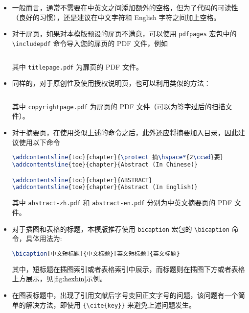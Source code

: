\begin{itemize}
    \item 一般而言，通常不需要在中英文之间添加额外的空格，但为了代码的可读性（良好的习惯），还是建议在中文字符和 English 字符之间加上空格。
    \item[\textdagger] 对于扉页，如果对本模版预设的扉页不满意，可以使用 \texttt{pdfpages} 宏包中的 \texttt{\textbackslash includepdf} 命令导入您的扉页的 PDF 文件，例如
\begin{lstlisting}[language=TeX]
% \maketitle

\end{lstlisting}
    其中 \texttt{titlepage.pdf} 为扉页的 PDF 文件。
    \item[\textdagger] 同样的，对于原创性及使用授权说明页，也可以利用类似的方法：
\begin{lstlisting}[language=TeX]
% \makecopyright

\end{lstlisting}
    其中 \texttt{copyrightpage.pdf} 为扉页的 PDF 文件（可以为签字过后的扫描文件）。
    \item[\textdagger] 对于摘要页，在使用类似上述的命令之后，此外还应将摘要加入目录，因此建议使用以下命令
\begin{lstlisting}[language=TeX]
% 
\addcontentsline{toc}{chapter}{\protect 摘\hspace*{2\ccwd}要}
\addcontentsline{toe}{chapter}{Abstract (In Chinese)}

\addcontentsline{toc}{chapter}{ABSTRACT}
\addcontentsline{toe}{chapter}{Abstract (In English)}

\end{lstlisting}
    其中 \texttt{abstract-zh.pdf} 和 \texttt{abstract-en.pdf} 分别为中英文摘要页的 PDF 文件。
    \item 对于插图和表格的标题，本模版推荐使用 \texttt{bicaption} 宏包的 \texttt{\textbackslash bicaption} 命令，具体用法为:
\begin{lstlisting}[language=TeX]
\bicaption[中文短标题]{中文标题}[英文短标题]{英文标题}
\end{lstlisting}
    其中，短标题在插图索引或者表格索引中展示，而标题则在插图下方或者表格上方展示，见\ref{fig:hexbin}示例。
    \item 在图表标题中，出现了引用文献后字号变回正文字号的问题，该问题有一个简单的解决方法，即使用 \texttt{\{\textbackslash cite\{key\}\}} 来避免上述问题发生。
\end{itemize}

